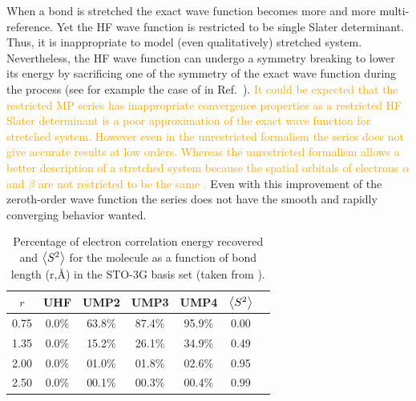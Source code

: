 \documentclass[11pt,a4paper]{article}
\newcommand{\antoine}[1]{\textcolor{orange}{#1}}
\begin{document}
When a bond is stretched the exact wave function becomes more and more multi-reference. Yet the HF wave function is restricted to be single Slater determinant.
Thus, it is inappropriate to model (even qualitatively) stretched system. Nevertheless, the HF wave function can undergo a symmetry breaking to lower its energy by sacrificing one of the symmetry of the exact wave function during the process (see for example the case of  in Ref.~\cite{SzaboBook}). \antoine{It could be expected that  the restricted MP series has inappropriate convergence properties as a restricted HF Slater determinant is a poor approximation of the exact wave function for stretched system. However even in the unrestricted formalism the series does not give accurate results at low orders. Whereas the unrestricted formalism allows a better description of a stretched system because the spatial orbitals of electrons $\alpha$ and $\beta$ are not restricted to be the same \cite{Fukutome_1981}.} Even with this improvement of the zeroth-order wave function the series does not have the smooth and rapidly converging behavior wanted. 

\begin{table}[h!]
    \centering
    \caption{\centering Percentage of electron correlation energy recovered and $\expval{S^2}$ for the  molecule as a function of bond length (r,\si{\angstrom}) in the STO-3G basis set (taken from \cite{Gill_1988}).}
    \begin{tabular}{ccccccc}
\hline
\hline
 $r$ & UHF & UMP2 & UMP3 & UMP4 & $\expval{S^2}$ \\
\hline
0.75 & 0.0\% & 63.8\% & 87.4\% & 95.9\% & 0.00\\
1.35 & 0.0\% & 15.2\% & 26.1\% & 34.9\% & 0.49\\
2.00 & 0.0\% & 01.0\% & 01.8\% & 02.6\% & 0.95\\
2.50 & 0.0\% & 00.1\% & 00.3\% & 00.4\% & 0.99\\
\hline
\hline
\end{tabular}
    \label{tab:SpinContamination}
\end{table}
\end{document}
